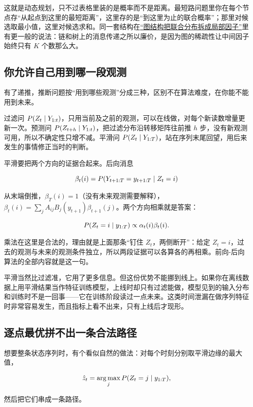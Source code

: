 这就是动态规划，只不过表格里装的是概率而不是距离。最短路问题里你在每个节点存``从起点到这里的最短距离''，这里存的是``到这里为止的联合概率''；那里对候选取最小值，这里对候选求和。同一套结构在\hyperref[sec:13-Machine-Learning/07-Graphical-and-Sequential-Models/01]{``图结构把联合分布拆成局部因子''}里有更一般的说法：链和树上的消息传递之所以廉价，是因为图的稀疏性让中间因子始终只有 \(K\) 个数那么大。

\subsection{你允许自己用到哪一段观测}

有了递推，推断问题按``用到哪些观测''分成三种，区别不在算法难度，在你能不能用到未来。

过滤问 \(P(Z_t\mid Y_{1:t})\)，只用当前及之前的观测，可以在线做，对每个新读数增量更新一次。预测问 \(P(Z_{t+h}\mid Y_{1:t})\)，把过滤分布沿转移矩阵往前推 \(h\) 步，没有新观测可用，所以不确定性只增不减。平滑问 \(P(Z_t\mid Y_{1:T})\)，站在序列末尾回望，用后来发生的事情修正当时的判断。

平滑要把两个方向的证据合起来。后向消息

\[
\beta_t(i)=P(Y_{t+1:T}=y_{t+1:T}\mid Z_t=i)
\]

从末端倒推，\(\beta_T(i)=1\)（没有未来观测需要解释），\(\beta_t(i)=\sum_jA_{ij}B_j(y_{t+1})\beta_{t+1}(j)\)。两个方向相乘就是答案：

\[
P(Z_t=i\mid y_{1:T})\propto\alpha_t(i)\beta_t(i).
\]

乘法在这里是合法的，理由就是上面那条``钉住 \(Z_t\)，两侧断开''：给定 \(Z_t=i\)，过去的观测与未来的观测条件独立，所以两段证据可以各算各的再相乘。前向-后向算法的全部内容就是这一句。

平滑当然比过滤准，它用了更多信息。但这份优势不能挪到线上。如果你在离线数据上用平滑结果当作特征训练模型，上线时却只有过滤能做，模型见到的输入分布和训练时不是一回事——它在训练阶段读过一点未来。这类时间泄漏在做序列特征时非常容易发生，而且指标上看不出来，只有上线后才现形。

\subsection{逐点最优拼不出一条合法路径}

想要整条状态序列时，有个看似自然的做法：对每个时刻分别取平滑边缘的最大值，

\[
\hat z_t=\operatorname*{arg\,max}_j P(Z_t=j\mid y_{1:T}),
\]

然后把它们串成一条路径。

